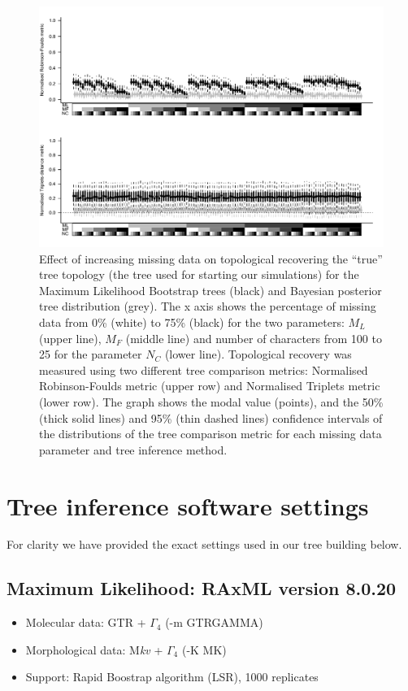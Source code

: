 \begin{figure}%
\centering
    \includegraphics[width=1\textwidth]{Supplementaries/Figures/TEM/Treesets_True.pdf}
    \caption[Comparison between the ``true'' and the ``missing-data'' trees for the Bootstraps and posterior distribution trees]{Effect of increasing missing data on topological recovering the ``true'' tree topology (the tree used for starting our simulations) for the Maximum Likelihood Bootstrap trees (black) and Bayesian posterior tree distribution (grey). The x axis shows the percentage of missing data from 0\% (white) to 75\% (black) for the two parameters: $M_{L}$ (upper line), $M_{F}$ (middle line) and number of characters from 100 to 25 for the parameter $N_{C}$ (lower line). Topological recovery was measured using two different tree comparison metrics: Normalised Robinson-Foulds metric (upper row) and Normalised Triplets metric (lower row). The graph shows the modal value (points), and the 50\% (thick solid lines) and 95\% (thin dashed lines) confidence intervals of the distributions of the tree comparison metric for each missing data parameter and tree inference method.} 
\label{Fig_Supp_Treesets_true} 
\end{figure}

\newpage
\section{Tree inference software settings}
\label{Software_settings}

For clarity we have provided the exact settings used in our tree building below.
\subsection*{Maximum Likelihood: RAxML version 8.0.20 \cite{Stamatakis21012014}}
\begin{itemize}
  \item Molecular data: GTR + $\Gamma_4$ (-m GTRGAMMA)
  \item Morphological data: M\textit{kv} + $\Gamma_4$ (-K MK)
  \item Support: Rapid Boostrap algorithm (LSR), 1000 replicates
\end{itemize}
